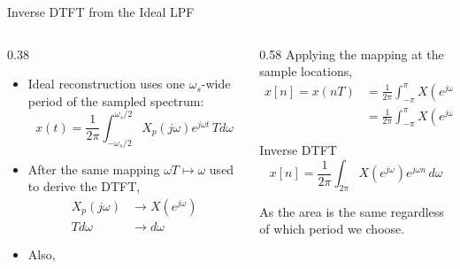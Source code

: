 \begin{frame}{Inverse DTFT from the Ideal LPF}
  \begin{columns}[T]
    \begin{column}{0.38\textwidth}
      \begin{itemize}
          \setlength{\itemsep}{0.3em}
        \item Ideal reconstruction uses one $\omega_s$-wide period of the sampled spectrum:
          \begin{equation*}
            x(t)=\frac{1}{2\pi}\int_{-\omega_s/2}^{\omega_s/2} X_p(j\omega)e^{j\omega t}\,Td\omega
          \end{equation*}
        \item After the same mapping $\omega T \mapsto \omega$  used to derive the DTFT,
          \begin{align*}
            X_p(j\omega) & \longrightarrow X(e^{j\omega}) \\
            T d\omega &\longrightarrow d\omega
          \end{align*}

        \item Also,
          \begin{center}
          \end{center}
      \end{itemize}

    \end{column}

    \begin{column}{0.58\textwidth}
      \small
      Applying the mapping at the sample locations,
      \begin{align*}
        x[n]=x(nT)
        &= \frac{1}{2\pi}\int_{-\pi}^{\pi} X(e^{j\omega})e^{j\frac{\omega}{T} Tn}\,d\omega \\
        &= \frac{1}{2\pi}\int_{-\pi}^{\pi} X(e^{j\omega})e^{j\omega n}\,d\omega
      \end{align*}
      \vspace{0.04cm}
      \begin{conceptbox}{Inverse DTFT}
        \vspace{-0.2cm}
        \begin{equation*}
          x[n]=\frac{1}{2\pi}\int_{2\pi} X(e^{j\omega})e^{j\omega n}\,d\omega
        \end{equation*}
      \end{conceptbox}
      As the area is the same regardless of which period we choose.
    \end{column}
  \end{columns}
\end{frame}

